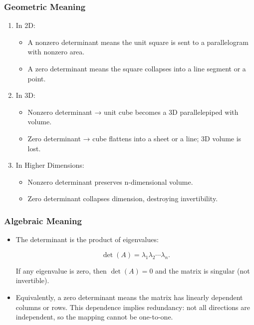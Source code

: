 \documentclass[
  letterpaper,
  DIV=11,
  numbers=noendperiod]{scrreprt}
\providecommand{\tightlist}{%
  \setlength{\itemsep}{0pt}\setlength{\parskip}{0pt}}
\begin{document}
\subsubsection{Geometric Meaning}\label{geometric-meaning-9}

\begin{enumerate}
\def\labelenumi{\arabic{enumi}.}
\item
  In 2D:

  \begin{itemize}
  \tightlist
  \item
    A nonzero determinant means the unit square is sent to a
    parallelogram with nonzero area.
  \item
    A zero determinant means the square collapses into a line segment or
    a point.
  \end{itemize}
\item
  In 3D:

  \begin{itemize}
  \tightlist
  \item
    Nonzero determinant → unit cube becomes a 3D parallelepiped with
    volume.
  \item
    Zero determinant → cube flattens into a sheet or a line; 3D volume
    is lost.
  \end{itemize}
\item
  In Higher Dimensions:

  \begin{itemize}
  \tightlist
  \item
    Nonzero determinant preserves n-dimensional volume.
  \item
    Zero determinant collapses dimension, destroying invertibility.
  \end{itemize}
\end{enumerate}

\subsubsection{Algebraic Meaning}\label{algebraic-meaning}

\begin{itemize}
\item
  The determinant is the product of eigenvalues:

  \[
  \det(A) = \lambda_1 \lambda_2 \cdots \lambda_n.
  \]

  If any eigenvalue is zero, then \(\det(A) = 0\) and the matrix is
  singular (not invertible).
\item
  Equivalently, a zero determinant means the matrix has linearly
  dependent columns or rows. This dependence implies redundancy: not all
  directions are independent, so the mapping cannot be one-to-one.
\end{itemize}
\end{document}
